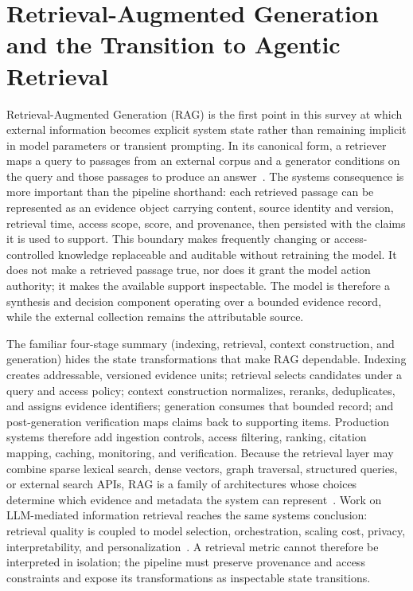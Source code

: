 \section{Retrieval-Augmented Generation and the Transition to Agentic Retrieval}
\label{sec:rag}

Retrieval-Augmented Generation (RAG) is the first point in this survey at which external information becomes explicit system state rather than remaining implicit in model parameters or transient prompting. In its canonical form, a retriever maps a query to passages from an external corpus and a generator conditions on the query and those passages to produce an answer~\cite{lewis2020rag}. The systems consequence is more important than the pipeline shorthand: each retrieved passage can be represented as an evidence object carrying content, source identity and version, retrieval time, access scope, score, and provenance, then persisted with the claims it is used to support. This boundary makes frequently changing or access-controlled knowledge replaceable and auditable without retraining the model. It does not make a retrieved passage true, nor does it grant the model action authority; it makes the available support inspectable. The model is therefore a synthesis and decision component operating over a bounded evidence record, while the external collection remains the attributable source.

The familiar four-stage summary (indexing, retrieval, context construction, and generation) hides the state transformations that make RAG dependable. Indexing creates addressable, versioned evidence units; retrieval selects candidates under a query and access policy; context construction normalizes, reranks, deduplicates, and assigns evidence identifiers; generation consumes that bounded record; and post-generation verification maps claims back to supporting items. Production systems therefore add ingestion controls, access filtering, ranking, citation mapping, caching, monitoring, and verification. Because the retrieval layer may combine sparse lexical search, dense vectors, graph traversal, structured queries, or external search APIs, RAG is a family of architectures whose choices determine which evidence and metadata the system can represent~\cite{gao2023ragsurvey}. Work on LLM-mediated information retrieval reaches the same systems conclusion: retrieval quality is coupled to model selection, orchestration, scaling cost, privacy, interpretability, and personalization~\cite{ghodratnama2024adapting}. A retrieval metric cannot therefore be interpreted in isolation; the pipeline must preserve provenance and access constraints and expose its transformations as inspectable state transitions.


